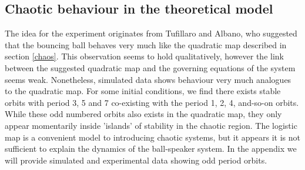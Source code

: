 \documentclass[12pt,oneside,a4paper]{article}
\numberwithin{equation}{section}
\begin{document}
{{{{\subsection{Chaotic behaviour in the theoretical model}
The idea for the experiment originates from Tufillaro and Albano\cite{tufillaro}, who suggested that the bouncing ball behaves very much like the quadratic map described in section \ref{chaos}. This observation seems to hold qualitatively, however the link between the suggested quadratic map and the governing equations of the system seems weak. Nonetheless, simulated data shows behaviour very much analogues to the quadratic map. For some initial conditions, we find there exists stable orbits with period 3, 5 and 7 co-existing with the period 1, 2, 4, and-so-on orbits. While these odd numbered orbits also exists in the quadratic map, they only appear momentarily inside 'islands' of stability in the chaotic region. The logistic map is a convenient model to introducing chaotic systems, but it appears it is not sufficient to explain the dynamics of the ball-speaker system. In the appendix we will provide simulated and experimental data showing odd period orbits.  
}}}}
\end{document}
